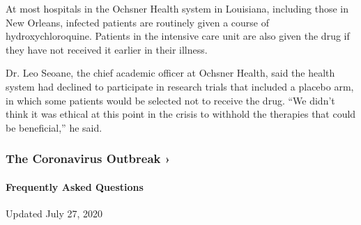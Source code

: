 At most hospitals in the Ochsner Health system in Louisiana, including
those in New Orleans, infected patients are routinely given a course of
hydroxychloroquine. Patients in the intensive care unit are also given
the drug if they have not received it earlier in their illness.

Dr. Leo Seoane, the chief academic officer at Ochsner Health, said the
health system had declined to participate in research trials that
included a placebo arm, in which some patients would be selected not to
receive the drug. ``We didn't think it was ethical at this point in the
crisis to withhold the therapies that could be beneficial,'' he said.

\href{https://www.nytimes.com/news-event/coronavirus?action=click\&pgtype=Article\&state=default\&region=MAIN_CONTENT_3\&context=storylines_faq}{}

\hypertarget{the-coronavirus-outbreak-}{%
\subsubsection{The Coronavirus Outbreak
›}\label{the-coronavirus-outbreak-}}

\hypertarget{frequently-asked-questions}{%
\paragraph{Frequently Asked
Questions}\label{frequently-asked-questions}}

Updated July 27, 2020

